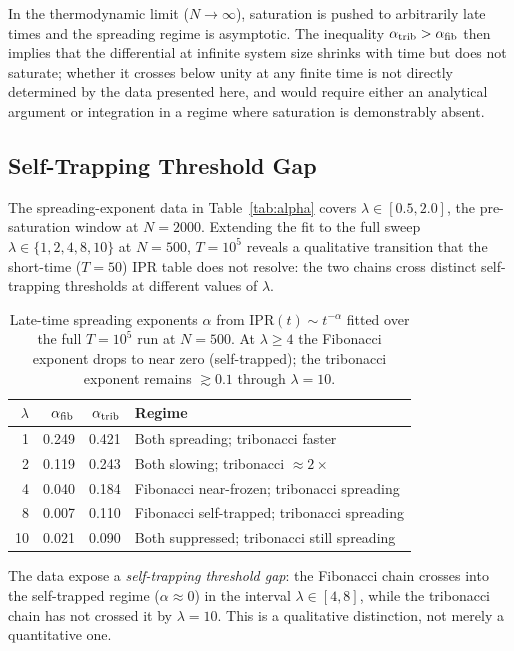 \documentclass[12pt,a4paper]{article}
\begin{document}
In the thermodynamic limit ($N \to \infty$), saturation is pushed to
arbitrarily late times and the spreading regime is asymptotic. The
inequality $\alpha_{\rm trib} > \alpha_{\rm fib}$ then implies that the
differential at infinite system size shrinks with time but does not
saturate; whether it crosses below unity at any finite time is not
directly determined by the data presented here, and would require either
an analytical argument or integration in a regime where saturation is
demonstrably absent.

\subsection{Self-Trapping Threshold Gap}
\label{sec:self_trapping}

The spreading-exponent data in Table~\ref{tab:alpha} covers
$\lambda \in [0.5, 2.0]$, the pre-saturation window at $N=2000$.
Extending the fit to the full sweep $\lambda \in \{1, 2, 4, 8, 10\}$
at $N=500$, $T=10^5$ reveals a qualitative transition that the short-time
($T=50$) IPR table does not resolve: the two chains cross distinct
self-trapping thresholds at different values of $\lambda$.

\begin{table}[h]
\centering
\caption{Late-time spreading exponents $\alpha$ from
$\mathrm{IPR}(t) \sim t^{-\alpha}$ fitted over the full $T=10^5$ run at
$N=500$. At $\lambda \geq 4$ the Fibonacci exponent drops to near zero
(self-trapped); the tribonacci exponent remains $\gtrsim 0.1$ through
$\lambda = 10$.}
\label{tab:alpha_full}
\begin{tabular}{r r r l}
\toprule
$\lambda$ & $\alpha_{\rm fib}$ & $\alpha_{\rm trib}$ & Regime \\
\midrule
1  & 0.249 & 0.421 & Both spreading; tribonacci faster \\
2  & 0.119 & 0.243 & Both slowing; tribonacci $\approx 2\times$ \\
4  & 0.040 & 0.184 & Fibonacci near-frozen; tribonacci spreading \\
8  & 0.007 & 0.110 & Fibonacci self-trapped; tribonacci spreading \\
10 & 0.021 & 0.090 & Both suppressed; tribonacci still spreading \\
\bottomrule
\end{tabular}
\end{table}

The data expose a \emph{self-trapping threshold gap}: the Fibonacci chain
crosses into the self-trapped regime ($\alpha \approx 0$) in the interval
$\lambda \in [4, 8]$, while the tribonacci chain has not crossed it by
$\lambda = 10$. This is a qualitative distinction, not merely a
quantitative one.
\end{document}
